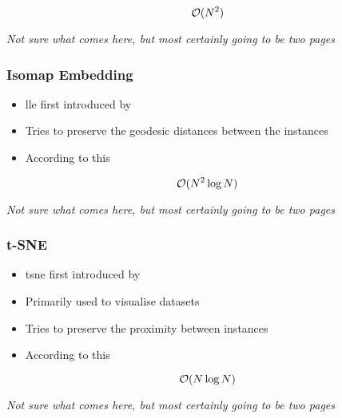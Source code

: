 $$\mathcal{O}(N^2)$$

\clearpage

\begin{center}
	\textit{Not sure what comes here, but most certainly going to be two pages}
\end{center}

\clearpage




\subsubsection{Isomap Embedding}

\begin{itemize}
	\item \Gls{lle} first introduced by \cite{tenenbaum2000global}
	\item Tries to preserve the geodesic distances between the instances \cite{HandsOnMLCh8}
	\item According to this \cite{DRUnsupervisedNearestNeighbors}
\end{itemize}

$$\mathcal{O}(N^2 \log N)$$

\clearpage

\begin{center}
	\textit{Not sure what comes here, but most certainly going to be two pages}
\end{center}

\clearpage



\subsubsection{t-SNE}

\begin{itemize}
	\item \gls{tsne} first introduced by \cite{van2008visualizing}
	\item Primarily used to visualise datasets
	\item Tries to preserve the proximity between instances \cite{HandsOnMLCh8}
	\item According to this \cite{van2014accelerating}
\end{itemize}

$$\mathcal{O}(N \log N)$$

\clearpage

\begin{center}
	\textit{Not sure what comes here, but most certainly going to be two pages}
\end{center}

\clearpage
